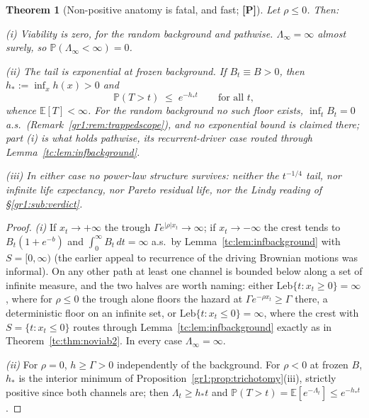 \documentclass[11pt]{article}
\numberwithin{equation}{section}
\theoremstyle{plain}
\newtheorem{theorem}{Theorem}[section]
\theoremstyle{definition}
\theoremstyle{remark}
\newcommand{\E}{\mathbb{E}}
\newcommand{\PP}{\mathbb{P}}
\begin{document}
\begin{theorem}[Non-positive anatomy is fatal, and fast; \textbf{[P]}]
\label{gr1:thm:trapped}
Let $\rho\le0$. Then:

\emph{(i) Viability is zero, for the random background and pathwise.}
$\Lambda_\infty=\infty$ almost surely, so $\PP(\Lambda_\infty<\infty)=0$.

\emph{(ii) The tail is exponential at frozen background.} If $B_t\equiv
B>0$, then $h_\ast:=\inf_x h(x)>0$ and
\begin{equation}\label{gr1:eq:trappedtail}
\PP(T>t)\;\le\;e^{-h_\ast t}\qquad\text{for all }t,
\end{equation}
whence $\E[T]<\infty$. For the random background no such floor
exists, $\inf_tB_t=0$ a.s.\ (Remark~\ref{gr1:rem:trappedscope}), and no exponential bound is claimed there; part (i) is what holds
pathwise, its recurrent-driver case routed through
Lemma~\ref{tc:lem:infbackground}.

\emph{(iii) In either case no power-law structure survives}: neither the
$t^{-1/4}$ tail, nor infinite life expectancy, nor Pareto residual life,
nor the Lindy reading of \S\ref{gr1:sub:verdict}.
\end{theorem}

\begin{proof}
\emph{(i)} If $x_t\to+\infty$ the trough $\Gamma e^{|\rho|x_t}\to\infty$;
if $x_t\to-\infty$ the crest tends to $B_t(1+e^{-b})$ and
$\int_0^\infty B_t\,dt=\infty$ a.s.\ by
Lemma~\ref{tc:lem:infbackground} with $S=[0,\infty)$ (the earlier
appeal to recurrence of the driving Brownian motions was informal).
On any other path at least one channel is bounded below along a set of
infinite measure, and the two halves are worth naming: either
$\mathrm{Leb}\{t:x_t\ge0\}=\infty$, where for $\rho\le0$ the trough
alone floors the hazard at $\Gamma e^{-\rho x_t}\ge\Gamma$ there, a deterministic floor on an infinite set, or
$\mathrm{Leb}\{t:x_t\le0\}=\infty$, where the crest with
$S=\{t:x_t\le0\}$ routes through Lemma~\ref{tc:lem:infbackground}
exactly as in Theorem~\ref{tc:thm:noviab2}. In every case
$\Lambda_\infty=\infty$.

\emph{(ii)} For $\rho=0$, $h\ge\Gamma>0$ independently of the background.
For $\rho<0$ at frozen $B$, $h_\ast$ is the interior minimum of
Proposition~\ref{gr1:prop:trichotomy}(iii), strictly positive since both
channels are; then $\Lambda_t\ge h_\ast t$ and
$\PP(T>t)=\E[e^{-\Lambda_t}]\le e^{-h_\ast t}$.
\end{proof}
\end{document}
